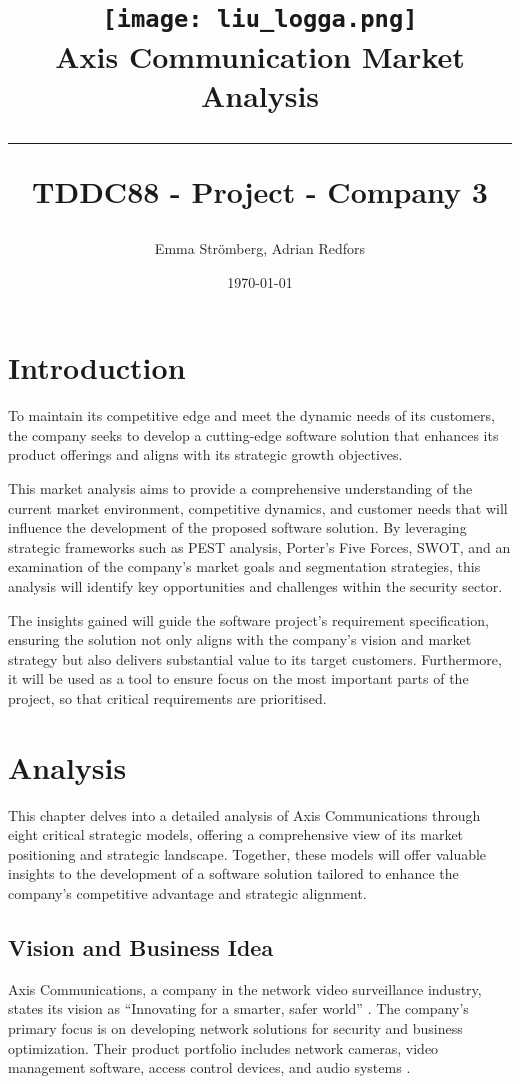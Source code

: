 \documentclass{article}
\title{
\texttt{[image: liu\_logga.png]} \\
\vspace{2.0cm} \textbf{Axis Communication Market Analysis} \\
 \endgraf\rule{\textwidth}{.4pt}
  \large \textbf{TDDC88 - Project - Company 3}\\
   }
\author{Emma Strömberg, Adrian Redfors}
\date{\today}
\begin{document}
\maketitle
\newpage
 


\newpage
\tableofcontents
\newpage

\section{Introduction}
To maintain its competitive edge and meet the dynamic needs of its customers, the company seeks to develop a cutting-edge software solution that enhances its product offerings and aligns with its strategic growth objectives.

This market analysis aims to provide a comprehensive understanding of the current market environment, competitive dynamics, and customer needs that will influence the development of the proposed software solution. By leveraging strategic frameworks such as PEST analysis, Porter’s Five Forces, SWOT, and an examination of the company’s market goals and segmentation strategies, this analysis will identify key opportunities and challenges within the security sector. 

The insights gained will guide the software project’s requirement specification, ensuring the solution not only aligns with the company’s vision and market strategy but also delivers substantial value to its target customers. Furthermore, it will be used as a tool to ensure focus on the most important parts of the project, so that critical requirements are prioritised. 


\newpage
\section{Analysis}
This chapter delves into a detailed analysis of Axis Communications through eight critical strategic models, offering a comprehensive view of its market positioning and strategic landscape. Together, these models will offer valuable insights to the development of a software solution tailored to enhance the company's competitive advantage and strategic alignment.



\subsection{Vision and Business Idea}

Axis Communications, a company in the network video surveillance industry, states its vision as \enquote{Innovating for a smarter, safer world} \cite{axis_about}. The company's primary focus is on developing network solutions for security and business optimization. Their product portfolio includes network cameras, video management software, access control devices, and audio systems \cite{axis_about, axis_homepage}. 
\end{document}
